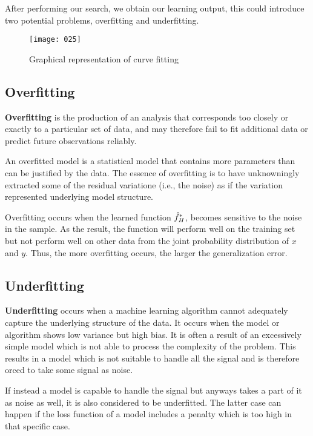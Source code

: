 After performing our search, we obtain our learning output, this could introduce two potential problems, overfitting and underfitting.
\begin{figure}[h]
\begin{center}
    \texttt{[image: 025]}
    \caption{Graphical representation of curve fitting}
\end{center}
\end{figure}

\subsection{Overfitting}
\textbf{Overfitting} is the production of an analysis that corresponds too closely or exactly to a particular set of data, and may therefore fail to fit additional data or predict future observations reliably.

An overfitted model is a statistical model that contains more parameters than can be justified by the data. The essence of overfitting is to have unknowningly extracted some of the residual variatione (i.e., the noise) as if the variation represented underlying model structure.

Overfitting occurs when the learned function \(\Hat{f}_H^*\), becomes sensitive to the noise in the sample. As the result, the function will perform well on the training set but not perform well on other data from the joint probability distribution of \(x\) and \(y\). Thus, the more overfitting occurs, the larger the generalization error.

\subsection{Underfitting}
\textbf{Underfitting} occurs when a machine learning algorithm cannot adequately capture the underlying structure of the data. It occurs when the model or algorithm shows low variance but high bias. It is often a result of an excessively simple model which is not able to process the complexity of the problem. This results in a model which is not suitable to handle all the signal and is therefore orced to take some signal as noise. 

If instead a model is capable to handle the signal but anyways takes a part of it as noise as well, it is also considered to be underfitted. The latter case can happen if the loss function of a model includes a penalty which is too high in that specific case.

